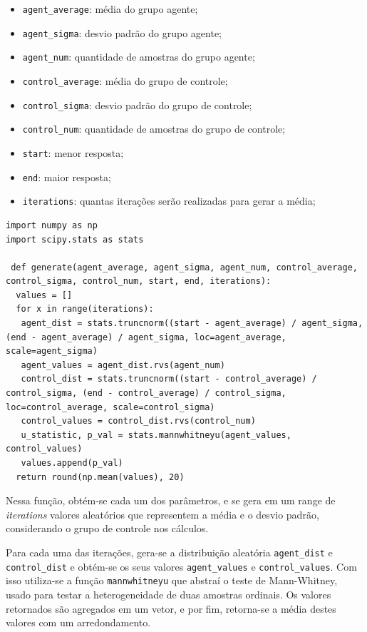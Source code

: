 \documentclass[12pt]{article}
\begin{document}
\begin{itemize}
	\item \texttt{agent\_average}: média do grupo agente;
	\item \texttt{agent\_sigma}: desvio padrão do grupo agente;
	\item \texttt{agent\_num}: quantidade de amostras do grupo agente;
	\item \texttt{control\_average}: média do grupo de controle;
	\item \texttt{control\_sigma}: desvio padrão do grupo de controle;
	\item \texttt{control\_num}: quantidade de amostras do grupo de controle;
	\item \texttt{start}: menor resposta;
	\item \texttt{end}: maior resposta;
	\item \texttt{iterations}: quantas iterações serão realizadas para gerar a média;
\end{itemize}

\begin{lstlisting}[caption={Definição da Função Genérica},captionpos=b,frame=single,label={code:1}]
import numpy as np
import scipy.stats as stats
 
 def generate(agent_average, agent_sigma, agent_num, control_average, control_sigma, control_num, start, end, iterations):
  values = []
  for x in range(iterations):
   agent_dist = stats.truncnorm((start - agent_average) / agent_sigma, (end - agent_average) / agent_sigma, loc=agent_average, scale=agent_sigma)
   agent_values = agent_dist.rvs(agent_num)
   control_dist = stats.truncnorm((start - control_average) / control_sigma, (end - control_average) / control_sigma, loc=control_average, scale=control_sigma)
   control_values = control_dist.rvs(control_num)
   u_statistic, p_val = stats.mannwhitneyu(agent_values, control_values)
   values.append(p_val)
  return round(np.mean(values), 20)
\end{lstlisting}

Nessa função, obtém-se cada um dos parâmetros, e se gera em um range de \textit{iterations} valores aleatórios que representem a média e o desvio padrão, considerando o grupo de controle nos cálculos.

Para cada uma das iterações, gera-se a distribuição aleatória \texttt{agent\_dist} e \texttt{control\_dist} e obtém-se os seus valores \texttt{agent\_values} e \texttt{control\_values}. Com isso utiliza-se a função \texttt{mannwhitneyu} que abstraí o teste de Mann-Whitney, usado para testar a heterogeneidade de duas amostras ordinais. Os valores retornados são agregados em um vetor, e por fim, retorna-se a média destes valores com um arredondamento.
\end{document}
